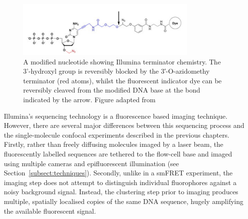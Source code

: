 \begin{figure}
\centerline{\includegraphics[width=0.8\textwidth]{illumina/illumina_linker.pdf}}
\caption{A modified nucleotide showing Illumina terminator chemistry. The 3'-hydroxyl group is reversibly blocked by the 3′-O-azidomethy terminator (red atoms), whilst the fluorescent indicator dye can be reversibly cleaved from the modified DNA base at the bond indicated by the arrow. Figure adapted from~\cite{Chen2013}}
\label{fig:terminator}
\end{figure}  

Illumina's sequencing technology is a fluorescence based imaging technique. However, there are several major differences between this sequencing process and the single-molecule confocal experiments described in the previous chapters. Firstly, rather than freely diffusing molecules imaged by a laser beam, the fluorescently labelled sequences are tethered to the flow-cell base and imaged using multiple cameras and epifluorescent illumination (see Section~\ref{subsect:techniques}). Secondly, unlike in a smFRET experiment, the imaging step does not attempt to distinguish individual fluorophores against a noisy background signal. Instead, the clustering step prior to imaging produces multiple, spatially localised copies of the same DNA sequence, hugely amplifying the available fluorescent signal. 

